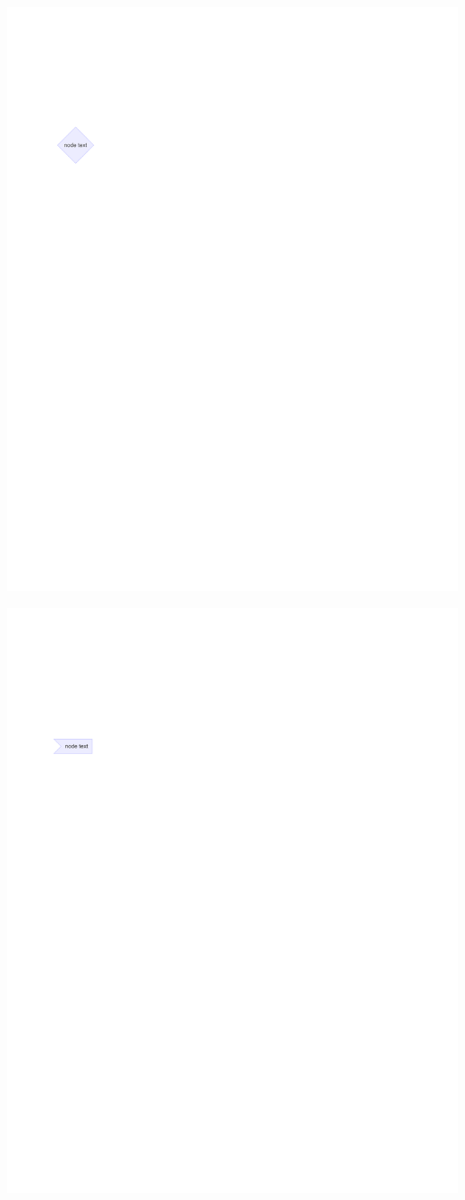 \documentclass[
  letterpaper,
]{scrbook}
\begin{document}
\includegraphics{./summary_files/figure-pdf/unnamed-chunk-4-4.pdf}

\includegraphics{./summary_files/figure-pdf/unnamed-chunk-4-5.pdf}
\end{document}
